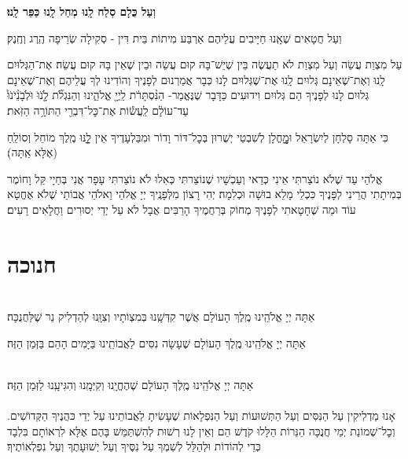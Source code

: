 \documentclass[twoside, openany, parskip=half, 11pt]{book}
\begin{document}
\textbf{וְעַל כֻּלָם סְלַח לָֽנוּ מְחַל לָֽנוּ כַּפֵּר לָֽנוּ׃}

וְעַל חֲטָאִים שֶׁאָֽנוּ חַיָּיבִים עֲלֵיהֶם אַרְבַּע מִיתוֹת בֵּית דִּין - סְקִילָה שְׂרֵיפָה הֶֽרֶג וְחֶֽנֶק׃

עַל מִצְוַת עֲשֵׂה וְעַל מִצְוַת לֹא תַעֲשֶׂה בֵּין שֶׁיֵשׁ־בָּהּ קוּם עֲשֵׂה וּבֵין שֶׁאֵין בָּהּ קוּם עֲשֵׂה׃ אֶת־הַגְּלוּיִם לָֽנוּ וְאֶת־שֶׁאֵינָם גְּלוּיִם לָֽנוּ אֶת־שֶׁגְּלוּיִם לָנוּ כְּבָר אֲמַרְנוּם לְפָנֶיךָ וְהוֹדִינוּ לְךָ עֲלֵיהֶם וְאֶת־שֶׁאֵינָם גְּלוּיִם לָנוּ לְפָנֶיךָ הֵם גְּלוּיִם וִידוּעִים כַּדָּבָר שֶׁנֶּאֱמַר- הַנִּ֨סְתָּרֹ֔ת
לַֽיְיָ֖ אֱלֹהֵ֑ינוּ וְהַנִּגְלֹ֞ת לָֹ֤נֹוֹּ וֹּלְֹבָֹנֵֹ֨יֹנֹוֹּ֙ עַד־עוֹלָ֔ם לַֽעֲשׂ֕וֹת אֶת־כׇּל־דִּבְרֵ֖י הַתּוֹרָ֥ה הַזֹּֽאת׃

כִּי אַתָּה סָלְחָן לְיִשְׂרָאֵל וּמׇׇׇׇׇחֳלָן לְשִׁבְטֵי יְשֻׁרוּן בְּכׇל־דּוֹר וָדוֹר
וּמִבַּלְעָדֶיךָ אֵין לׇׇׇֽנּוּ מֶֽלֶךְ מוֹחֵל וְסוֹלֵֽחַ (אֶלָּא אַֽתָּה)׃

אֱלֹהַי עַד שֶׁלֹא נוֹצַרתִּי אֵינִי כְּדַאי וְעַכְשָׁיו שֶׁנוֹצַרתִּי כְּאִלוּ לֹא נוֹצַרתִּי עָפָר אֲנִי בְּחַיָי קַּל וָחוֹמֶר בְּמִיתָתִי הֲרֵינִי לְפָּנֶיךָ כִּכְלֵי מָלֵא בוּשָׁה וּכְלִמָה׃ יְהִי רָצוֹן מִלְּפָנֶֽיךָ יְיָ אֱלֹהַי וֵאלֹהֵי אֲבוֹתַי שֶׁלֹא אֶחֱטָא עוֹד וּמַה שֶׁחָטָאתִי לְפָנֶיךָ מְחוֹק בְּרַחֲמֶיךָ הָרַבִּים אֲבָל לֹא עַל יְדֵי יְסוּרִים וַחֲלָאִים רָעִים׃

\vfill
\sepline

\chapter[חנוכה]{ חנוכה }
\label{chanukah}

\\
אַתָּה יְיָ אֱלֹהֵֽינוּ מֶֽלֶךְ הָעוֹלָם
אֲשֶׁר קִדְּשָֽׁנוּ בְּמִצְוֹתָיו וְצִוָּֽנוּ לְהַדְלִיק נֵר שֶׁלַּחֲנֻכָּה׃

אַתָּה יְיָ אֱלֹהֵֽינוּ מֶֽלֶךְ הָעוֹלָם שֶׁעָשָׂה נִסִּים לַאֲבוֹתֵֽינוּ בַּיָּמִים הָהֵם בַּזְּמַן הַזֶּה׃

\\
אַתָּה יְיָ אֱלֹהֵֽינוּ מֶֽלֶךְ הָעוֹלָם שֶׁהֶחֱיָֽנוּ וְקִיְּמָֽנוּ וְהִגִּיעָֽנוּ לַזְּמַן הַזֶּה׃\\

\\
אָנוּ מַדְלִיקִין
עַל הַנִּסִּים וְעַל הַתְּשׁוּעוֹת
וְעַל הַנִּפְלָאוֹת
שֶׁעָשִׂיתָ לַאֲבוֹתֵינוּ
עַל יְדֵי כּהֲנֶיךָ הַקְּדוֹשִׁים.
וְכׇל־שְׁמוֹנַת יְמֵי חֲנֻכָּה
הַנֵּרוֹת הַלָּלוּ קֹדֶשׁ הֵם
וְאֵין לָנוּ רְשׁוּת לְהִשְׁתַּמֵּשׁ בָּהֶם
אֶלָּא לִרְאוֹתָם בִּלְבָד
כְּדֵי לְהוֹדוֹת וּלְהַלֵּל לְשִׁמְךָ
עַל נִסֶּיךָ וְעַל יְשׁוּעָתֶךָ
וְעַל נִפְלְאוֹתֶיךָ׃
\end{document}
